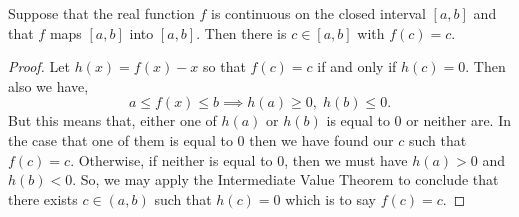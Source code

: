 \documentclass[../MathsNotesBase.tex]{subfiles}
\begin{document}
{		\bigskip
		\begin{corollary}
			\label{coro:continuous_func_mapping_interval_to_itself_has_invariant_point}
			Suppose that the real function $f$ is continuous on the closed interval ${ [a,b] }$ and that $f$ maps ${ [a,b] }$ into ${ [a,b] }$. Then there is ${ c \in [a,b] }$ with ${ f(c) = c }$.
		\end{corollary}
		\begin{proof}
			Let ${ h(x) = f(x) - x }$ so that ${ f(c) = c }$ if and only if ${ h(c) = 0 }$. Then also we have,
			\[ a \leq f(x) \leq b \implies h(a) \geq 0,\; h(b) \leq 0. \]
			But this means that, either one of $h(a)$ or $h(b)$ is equal to 0 or neither are. In the case that one of them is equal to 0 then we have found our $c$ such that ${ f(c) = c }$. Otherwise, if neither is equal to 0, then we must have ${ h(a) > 0 }$ and ${ h(b) < 0 }$. So, we may apply the Intermediate Value Theorem to conclude that there exists ${ c \in (a,b) }$ such that ${ h(c) = 0 }$ which is to say ${ f(c) = c }$.
		\end{proof}

		\bigskip
}
\end{document}
